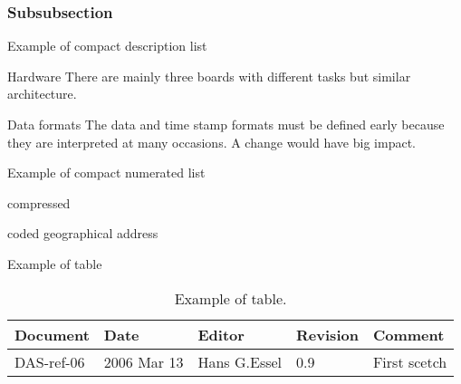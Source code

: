 \subsubsection{Subsubsection}

Example of compact description list
\begin{compactdesc}
\item[Hardware] There are mainly three boards with different tasks but similar architecture.
\item[Data formats] The data and time stamp formats must be defined early because they are
interpreted at many occasions. A change would have big impact.
\end{compactdesc}

Example of compact numerated list
\begin{compactenum}
\item compressed
\item coded geographical address
\end{compactenum}

Example of table
\begin{table}[h]
\begin{tabular}{|p{2.0cm}|p{2.0cm}|p{3.0cm}|p{1.6cm}|p{5.0cm}|}      \hline
Document   & Date        & Editor       & Revision & Comment      \\ \hline
DAS-ref-06 & 2006 Mar 13 & Hans G.Essel & 0.9      & First scetch \\ \hline
\end{tabular}
\caption{Example of table.}
\label{ref-table}
\end{table}
